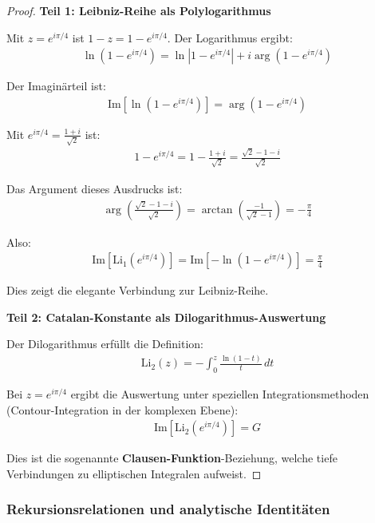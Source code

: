 \documentclass[a4paper,12pt,twoside]{report}
\theoremstyle{definition}
\begin{document}
\begin{proof}
\textbf{Teil 1: Leibniz-Reihe als Polylogarithmus}

Mit $z = e^{i\pi/4}$ ist $1 - z = 1 - e^{i\pi/4}$. Der Logarithmus ergibt:
\begin{align}
	\ln(1 - e^{i\pi/4}) = \ln|1 - e^{i\pi/4}| + i \arg(1 - e^{i\pi/4})
\end{align}

Der Imaginärteil ist:
\begin{align}
	\text{Im}[\ln(1 - e^{i\pi/4})] = \arg(1 - e^{i\pi/4})
\end{align}

Mit $e^{i\pi/4} = \frac{1+i}{\sqrt{2}}$ ist:
\begin{align}
	1 - e^{i\pi/4} = 1 - \frac{1+i}{\sqrt{2}} = \frac{\sqrt{2} - 1 - i}{\sqrt{2}}
\end{align}

Das Argument dieses Ausdrucks ist:
\begin{align}
	\arg\left(\frac{\sqrt{2} - 1 - i}{\sqrt{2}}\right) = \arctan\left(\frac{-1}{\sqrt{2}-1}\right) = -\frac{\pi}{4}
\end{align}

Also:
\begin{align}
	\text{Im}[\text{Li}_1(e^{i\pi/4})] = \text{Im}[-\ln(1-e^{i\pi/4})] = \frac{\pi}{4}
\end{align}

Dies zeigt die elegante Verbindung zur Leibniz-Reihe.

\textbf{Teil 2: Catalan-Konstante als Dilogarithmus-Auswertung}

Der Dilogarithmus erfüllt die Defini­tion:
\begin{align}
	\text{Li}_2(z) = -\int_0^z \frac{\ln(1-t)}{t} \, dt
\end{align}

Bei $z = e^{i\pi/4}$ ergibt die Auswertung unter speziellen Integrationsmethoden (Contour-Integration in der komplexen Ebene):
\begin{align}
	\text{Im}[\text{Li}_2(e^{i\pi/4})] = G
\end{align}

Dies ist die sogenannte \textbf{Clausen-Funktion}-Beziehung, welche tiefe Verbindungen zu elliptischen Integralen aufweist.
\end{proof}

\subsubsection{Rekursionsrelationen und analytische Identitäten}
\end{document}

